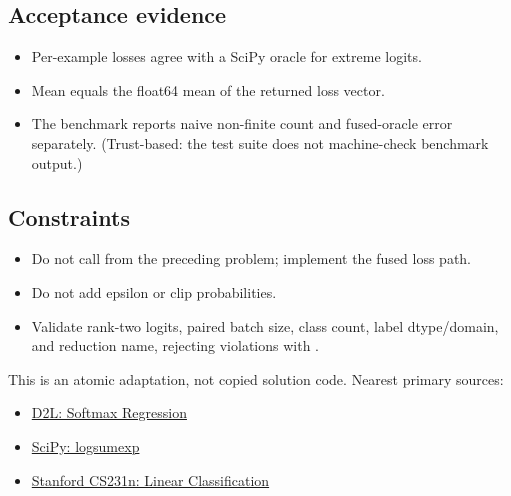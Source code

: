         \subsection{Acceptance evidence}

        \begin{evidencebox}
        \begin{itemize}
          \item Per-example losses agree with a SciPy  oracle for extreme logits.
  \item Mean equals the float64 mean of the returned loss vector.
  \item The benchmark reports naive non-finite count and fused-oracle error separately. (Trust-based: the test suite does not machine-check benchmark output.)
        \end{itemize}
        \end{evidencebox}

        \subsection{Constraints}

        \begin{itemize}
          \item Do not call  from the preceding problem; implement the fused loss path.
  \item Do not add epsilon or clip probabilities.
  \item Validate rank-two logits, paired batch size, class count, label dtype/domain, and reduction name, rejecting violations with .
        \end{itemize}

        \begin{sourcebox}
        This is an atomic adaptation, not copied solution code. Nearest primary sources:
        \begin{itemize}
          \item \href{https://d2l.ai/chapter_linear-classification/softmax-regression.html}{D2L: Softmax Regression}
  \item \href{https://docs.scipy.org/doc/scipy/reference/generated/scipy.special.logsumexp.html}{SciPy: logsumexp}
  \item \href{https://cs231n.github.io/linear-classify/}{Stanford CS231n: Linear Classification}
        \end{itemize}
        \end{sourcebox}
